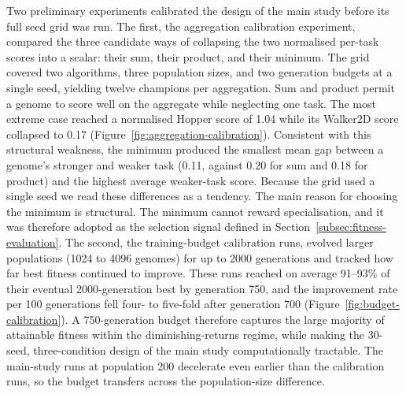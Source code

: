 \documentclass[12pt]{article}
\newcommand{\revBrit}[2]{#2}
\newcommand{\revFig}[2]{#2}
\begin{document}
Two preliminary experiments calibrated the design of the main study before its full seed grid was run.
The first, the aggregation calibration experiment, compared the three candidate ways of collapsing the two normalised per-task scores into a scalar: their sum, their product, and their minimum.
The grid covered two algorithms, three population sizes, and two generation budgets at a single seed, yielding twelve champions per aggregation.
Sum and product permit a genome to score well on the aggregate while neglecting one task. The most extreme case reached a normalised Hopper score of 1.04 while its Walker2D score collapsed to 0.17 (Figure~\ref{fig:aggregation-calibration}).
Consistent with this structural weakness, the minimum produced the smallest mean gap between a genome's stronger and weaker task (0.11, against 0.20 for sum and 0.18 for product) and the highest average weaker-task score.
Because the grid used a single seed we read these differences as a tendency. The main reason for choosing the minimum is structural.
\revBrit{E-08}{The minimum cannot reward specialisation}, and it was therefore adopted as the selection signal defined in Section~\ref{subsec:fitness-evaluation}.
The second, the training-budget calibration runs, evolved larger populations \revFig{F-04}{(1024 to 4096 genomes) for up to 2000 generations} and tracked how far best fitness continued to improve.
These runs reached on average 91--93\% of their eventual 2000-generation best by generation 750, and the improvement rate per 100 generations fell four- to five-fold after generation 700 (Figure~\ref{fig:budget-calibration}).
A 750-generation budget therefore captures the large majority of attainable fitness within the diminishing-returns regime, while making the 30-seed, three-condition design of the main study computationally tractable.
The main-study runs at population 200 decelerate even earlier than the calibration runs, so the budget transfers across the population-size difference.
\end{document}
